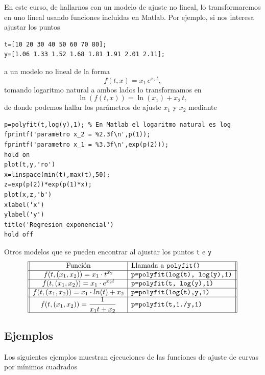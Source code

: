 \documentclass[letterpaper,11pt]{article}
\begin{document}
En este curso, de hallarnos con un modelo de ajuste no lineal, lo transformaremos en uno lineal usando funciones incluidas en Matlab.
Por ejemplo, si nos interesa ajustar los puntos 
\begin{lstlisting}
t=[10 20 30 40 50 60 70 80];
y=[1.06 1.33 1.52 1.68 1.81 1.91 2.01 2.11];
\end{lstlisting}
a un modelo no lineal de la forma 
$$
f(t,x)=x_1 \, e^{x_2 \, t},
$$
tomando logaritmo natural a ambos lados lo transformamos en
$$
\ln(f(t,x))= \ln(x_1)+ x_2 \, t,
$$
de donde podemos hallar los par\'ametros de ajuste $x_1$ y $x_2$ mediante
\begin{lstlisting}
p=polyfit(t,log(y),1); % En Matlab el logaritmo natural es log
fprintf('parametro x_2 = %2.3f\n',p(1));
fprintf('parametro x_1 = %3.3f\n',exp(p(2)));
hold on
plot(t,y,'ro')
x=linspace(min(t),max(t),50);
z=exp(p(2))*exp(p(1)*x);
plot(x,z,'b')
xlabel('x')
ylabel('y')
title('Regresion exponencial')
hold off
\end{lstlisting}

Otros modelos que se pueden encontrar al ajustar los puntos \texttt{t} e \texttt{y}
$$
\begin{array}{||c|l||}
  \hline
  \text{Funci\'on}				& \text{Llamada a \texttt{polyfit()}} \\
  \hline
  \displaystyle
  f(t,(x_1,x_2))=x_1\cdot t^{x_2}		& \texttt{p=polyfit(log(t), log(y),1)}\\
  \hline
  \displaystyle
  f(t,(x_1,x_2))=x_1\cdot e^{x_2t}		& \texttt{p=polyfit(t, log(y),1)}\\
  \hline    
  \displaystyle
  f(t,(x_1,x_2))=x_1 \cdot ln(t)+x_2	& \texttt{p=polyfit(log(t),y,1)} \\
  \hline
  \displaystyle
  f(t,(x_1,x_2))=\frac{1}{x_1t+x_2}		& \texttt{p=polyfit(t,1./y,1)}\\ 
  \hline
\end{array}
$$

\subsection{Ejemplos}
                                                                                                                                                                 
Los siguientes ejemplos muestran ejecuciones de las funciones de ajuste de curvas por m\'inimos cuadrados
\end{document}
